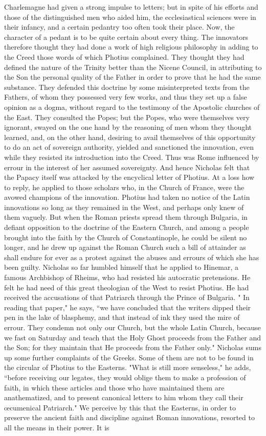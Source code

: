 Charlemagne had given a strong impulse to letters; but in spite of his efforts and those of the distinguished men who aided him, the ecclesiastical sciences were in their infancy, and a certain pedantry too often took their place. Now, the character of a pedant is to be quite certain about every thing. The innovators therefore thought they had done a work of high religious philosophy in adding to the Creed those words of which Photius complained. They thought they had defined the nature of the Trinity better than the Nicene Council, in attributing to the Son the personal quality of the Father in order to prove that he had the same substance. They defended this doctrine by some misinterpreted texts from the Fathers, of whom they possessed very few works, and thus they set up a false opinion as a dogma, without regard to the testimony of the Apostolic churches of the East. They consulted the Popes; but the Popes, who were themselves very ignorant, swayed on the one hand by the reasoning of men whom they thought learned, and, on the other hand, desiring to avail themselves of this opportunity to do an act of sovereign authority, yielded and sanctioned the innovation, even while they resisted its introduction into the Creed. Thus was Rome influenced by errour in the interest of her assumed sovereignty. And hence Nicholas felt that the Papacy itself was attacked by the encyclical letter of Photius. At a loss how to reply, he applied to those scholars who, in the Church of France, were the avowed champions of the innovation. Photius had taken no notice of the Latin innovations so long as they remained in the West, and perhaps only knew of them vaguely. But when the Roman priests spread them through Bulgaria, in defiant opposition to the doctrine of the Eastern Church, and among a people brought into the faith by the Church of Constantinople, he could be silent no longer, and he drew up against the Roman Church such a bill of attainder as shall endure for ever as a protest against the abuses and errours of which she has been guilty. Nicholas so far humbled himself that he applied to Hinemar, a famous Archbishop of Rheims, who had resisted his autocratic pretensions. He felt he had need of this great theologian of the West to resist Photius. He had received the accusations of that Patriarch through the Prince of Bulgaria. " In reading that paper," he says, “we have concluded that the writers dipped their pen in the lake of blasphemy, and that instead of ink they used the mire of errour. They condemn not only our Church, but the whole Latin Church, because we fast on Saturday and teach that the Holy Ghost proceeds from the Father and the Son; for they maintain that He proceeds from the Father only." Nicholas sums up some further complaints of the Greeks. Some of them are not to be found in the circular of Photius to the Easterns. "What is still more senseless," he adds, “before receiving our legates, they would oblige them to make a profession of faith, in which these articles and those who have maintained them are anathematized, and to present canonical letters to him whom they call their œcumenical Patriarch." We perceive by this that the Easterns, in order to preserve the ancient faith and discipline against Roman innovations, resorted to all the means in their power. It is 